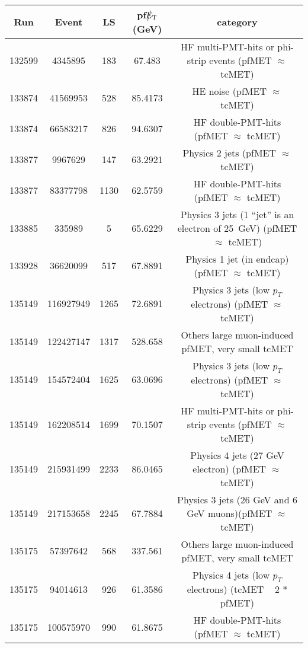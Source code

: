 \begin{table}[htbp]
  \begin{center}
    \begin{tabular}{|c|c|c|c|c|}
      \hline
      Run & Event & LS & pf$\big\slash\hspace{-1.6ex}{E_\text{T}}$ (GeV) & category \\     
      \hline
      132599 & 4345895     &  183  &    67.483   & HF multi-PMT-hits or phi-strip events (pfMET $\approx$ tcMET) \\ 
      133874 & 41569953    &  528  &    85.4173  & HE noise (pfMET $\approx$ tcMET) \\
      133874 & 66583217    &  826  &    94.6307  & HF double-PMT-hits  (pfMET $\approx$ tcMET) \\
      133877 & 9967629     &  147  &    63.2921  & Physics 2 jets (pfMET $\approx$ tcMET) \\
      133877 & 83377798    &  1130 &    62.5759  & HF double-PMT-hits  (pfMET $\approx$ tcMET) \\
      133885 & 335989      &  5    &    65.6229  & Physics 3 jets (1 ``jet'' is an electron of 25~GeV) (pfMET $\approx$ tcMET) \\ 
      133928 & 36620099    &  517  &    67.8891  & Physics 1 jet (in endcap) (pfMET $\approx$ tcMET) \\ 
      135149 & 116927949   &  1265 &    72.6891  & Physics 3 jets (low $p_T$ electrons) (pfMET $\approx$ tcMET) \\ 
      135149 & 122427147   &  1317 &    528.658  & Others large muon-induced pfMET, very small tcMET \\
      135149 & 154572404   &  1625 &    63.0696  & Physics 3 jets (low $p_T$ electrons) (pfMET $\approx$ tcMET) \\ 
      135149 & 162208514   &  1699 &    70.1507  & HF multi-PMT-hits or phi-strip events (pfMET $\approx$ tcMET) \\
      135149 & 215931499   &  2233 &    86.0465  & Physics 4 jets (27 GeV electron) (pfMET $\approx$ tcMET) \\ 
      135149 & 217153658   &  2245 &    67.7884  & Physics 3 jets (26 GeV and 6 GeV muons)(pfMET $\approx$ tcMET) \\ 
      135175 & 57397642    &  568  &    337.561  & Others large muon-induced pfMET, very small tcMET \\
      135175 & 94014613    &  926  &    61.3586  & Physics 4 jets (low $p_T$ electrons) (tcMET ~ 2 * pfMET) \\ 
      135175 & 100575970   &  990  &    61.8675  & HF double-PMT-hits (pfMET $\approx$ tcMET) \\

\end{tabular}
\end{center}
\end{table}
